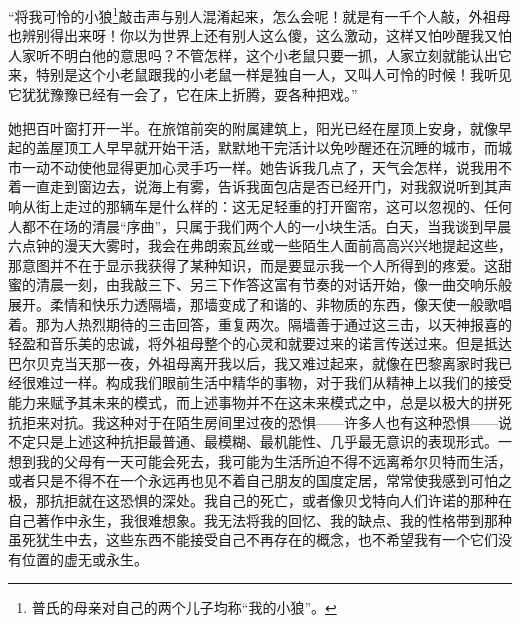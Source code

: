 \par “将我可怜的小狼\footnote{普氏的母亲对自己的两个儿子均称“我的小狼”。}敲击声与别人混淆起来，怎么会呢！就是有一千个人敲，外祖母也辨别得出来呀！你以为世界上还有别人这么傻，这么激动，这样又怕吵醒我又怕人家听不明白他的意思吗？不管怎样，这个小老鼠只要一抓，人家立刻就能认出它来，特别是这个小老鼠跟我的小老鼠一样是独自一人，又叫人可怜的时候！我听见它犹犹豫豫已经有一会了，它在床上折腾，耍各种把戏。”
\par 她把百叶窗打开一半。在旅馆前突的附属建筑上，阳光已经在屋顶上安身，就像早起的盖屋顶工人早早就开始干活，默默地干完活计以免吵醒还在沉睡的城市，而城市一动不动使他显得更加心灵手巧一样。她告诉我几点了，天气会怎样，说我用不着一直走到窗边去，说海上有雾，告诉我面包店是否已经开门，对我叙说听到其声响从街上走过的那辆车是什么样的：这无足轻重的打开窗帘，这可以忽视的、任何人都不在场的清晨“序曲”，只属于我们两个人的一小块生活。白天，当我谈到早晨六点钟的漫天大雾时，我会在弗朗索瓦丝或一些陌生人面前高高兴兴地提起这些，那意图并不在于显示我获得了某种知识，而是要显示我一个人所得到的疼爱。这甜蜜的清晨一刻，由我敲三下、另三下作答这富有节奏的对话开始，像一曲交响乐般展开。柔情和快乐力透隔墙，那墙变成了和谐的、非物质的东西，像天使一般歌唱着。那为人热烈期待的三击回答，重复两次。隔墙善于通过这三击，以天神报喜的轻盈和音乐美的忠诚，将外祖母整个的心灵和就要过来的诺言传送过来。但是抵达巴尔贝克当天那一夜，外祖母离开我以后，我又难过起来，就像在巴黎离家时我已经很难过一样。构成我们眼前生活中精华的事物，对于我们从精神上以我们的接受能力来赋予其未来的模式，而上述事物并不在这未来模式之中，总是以极大的拼死抗拒来对抗。我这种对于在陌生房间里过夜的恐惧——许多人也有这种恐惧——说不定只是上述这种抗拒最普通、最模糊、最机能性、几乎最无意识的表现形式。一想到我的父母有一天可能会死去，我可能为生活所迫不得不远离希尔贝特而生活，或者只是不得不在一个永远再也见不着自己朋友的国度定居，常常使我感到可怕之极，那抗拒就在这恐惧的深处。我自己的死亡，或者像贝戈特向人们许诺的那种在自己著作中永生，我很难想象。我无法将我的回忆、我的缺点、我的性格带到那种虽死犹生中去，这些东西不能接受自己不再存在的概念，也不希望我有一个它们没有位置的虚无或永生。
